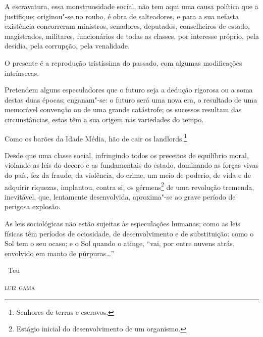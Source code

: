 A escravatura, essa monstruosidade social, não tem aqui uma causa
política que a justifique; originou"-se no roubo, é obra de salteadores,
e para a sua nefasta existência concorreram ministros, senadores,
deputados, conselheiros de estado, magistrados, militares, funcionários
de todas as classes, por interesse próprio, pela desídia, pela
corrupção, pela venalidade.

O presente é a reprodução tristíssima do passado, com algumas
modificações intrínsecas.

Pretendem alguns especuladores que o futuro seja a dedução rigorosa ou a
soma destas duas épocas; enganam"-se: o futuro será uma nova era, o
resultado de uma memorável convenção ou de uma grande catástrofe; os
sucessos resultam das circunstâncias, estas têm a sua origem nas
variedades do tempo.

Como os barões da Idade Média, hão de cair os landlords.\footnote{
  Senhores de terras e escravos.}

Desde que uma classe social, infringindo todos os preceitos de
equilíbrio moral, violando as leis do decoro e as fundamentais do
estado, dominando as forças vivas do país, fez da fraude, da violência,
do crime, um meio de poderio, de vida e de adquirir riquezas, implantou,
contra si, os gérmens\footnote{Estágio inicial do desenvolvimento de
  um organismo.} de uma
revolução tremenda, inevitável, que, lentamente desenvolvida,
aproxima"-se ao grave período de perigosa explosão.

As leis sociológicas não estão sujeitas às especulações humanas; como as
leis físicas têm períodos de ociosidade, de desenvolvimento e de
substituição: como o Sol tem o seu ocaso; e o Sol quando o atinge, ``vai,
por entre nuvens atrás, envolvido em manto de púrpuras\ldots{}''

\vfill

\hfill\ Teu

\hfill\textsc{luiz gama}

\pagebreak
\mbox{}\vfill
\thispagestyle{empty}

